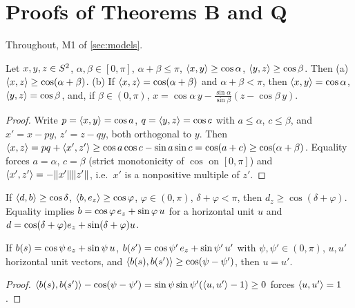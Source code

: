 \section{Proofs of Theorems B and Q}\label{app:B}
Throughout, M1 of \cref{sec:models}.

\begin{lemma}\label{lem:tri}
Let $x,y,z\in S^2$, $\alpha,\beta\in[0,\pi]$, $\alpha+\beta\le\pi$, $\langle x,y\rangle\ge\cos\alpha$, $\langle y,z\rangle\ge\cos\beta$. Then (a)
$\langle x,z\rangle\ge\cos(\alpha+\beta)$. (b) If $\langle x,z\rangle=\cos(\alpha+\beta)$ and $\alpha+\beta<\pi$, then $\langle x,y\rangle=\cos\alpha$, $\langle y,z\rangle=\cos\beta$, and,
if $\beta\in(0,\pi)$, $x=\cos\alpha\,y-\frac{\sin\alpha}{\sin\beta}(z-\cos\beta\,y)$.\Slean
\end{lemma}
\begin{proof}
Write $p=\langle x,y\rangle=\cos a$, $q=\langle y,z\rangle=\cos c$ with $a\le\alpha$, $c\le\beta$, and $x'=x-py$, $z'=z-qy$, both orthogonal to $y$. Then
$\langle x,z\rangle=pq+\langle x',z'\rangle\ge\cos a\cos c-\sin a\sin c=\cos(a+c)\ge\cos(\alpha+\beta)$. Equality forces $a=\alpha$, $c=\beta$ (strict
monotonicity of $\cos$ on $[0,\pi]$) and $\langle x',z'\rangle=-\lVert x'\rVert\lVert z'\rVert$, i.e.\ $x'$ is a nonpositive multiple of $z'$.
\end{proof}
\begin{corollary}\label{cor:extremal}
If $\langle d,b\rangle\ge\cos\delta$, $\langle b,e_z\rangle\ge\cos\varphi$, $\varphi\in(0,\pi)$, $\delta+\varphi<\pi$, then $d_z\ge\cos(\delta+\varphi)$. Equality implies
$b=\cos\varphi\,e_z+\sin\varphi\,u$ for a horizontal unit $u$ and $d=\cos(\delta+\varphi)e_z+\sin(\delta+\varphi)u$.
\end{corollary}
\begin{lemma}[Rigidity]\label{lem:rigid}
If $b(s)=\cos\psi\,e_z+\sin\psi\,u$, $b(s')=\cos\psi'\,e_z+\sin\psi'\,u'$ with $\psi,\psi'\in(0,\pi)$, $u,u'$ horizontal unit vectors, and
$\langle b(s),b(s')\rangle\ge\cos(\psi-\psi')$, then $u=u'$.\Slean
\end{lemma}
\begin{proof}
$\langle b(s),b(s')\rangle-\cos(\psi-\psi')=\sin\psi\sin\psi'(\langle u,u'\rangle-1)\ge0$ forces $\langle u,u'\rangle=1$.
\end{proof}

